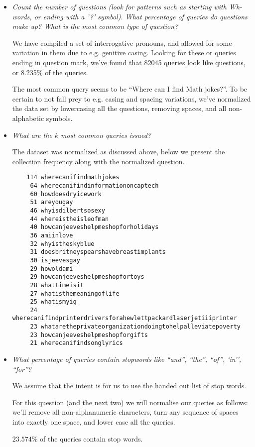 \begin{itemize}
\item \emph{Count the number of questions (look for patterns such as starting
with Wh-words, or ending with a '?'    symbol). What percentage of queries do
questions make up? What is the most common type of question?}

We have compiled a set of interrogative pronouns, and allowed for some variation
in them due to e.g. genitive casing. Looking for these or queries ending in
question mark, we've found that 82045 queries look like questions, or 8.235\%
of the queries.

The most common query seems to be ``Where can I find Math jokes?''. To be
certain to not fall prey to e.g. casing and spacing variations, we've
normalized the data set by lowercasing all the questions, removing spaces, and
all non-alphabetic symbols.

\item \emph{What are the $k$ most common queries issued?}

The dataset was normalized as discussed above, below we present the collection
frequency along with the normalized question.

\begin{lstlisting}
    114 wherecanifindmathjokes
     64 wherecanifindinformationoncaptech
     60 howdoesdryicework
     51 areyougay
     46 whyisdilbertsosexy
     44 whereistheisleofman
     40 howcanjeeveshelpmeshopforholidays
     36 amiinlove
     32 whyistheskyblue
     31 doesbritneyspearshavebreastimplants
     30 isjeevesgay
     29 howoldami
     29 howcanjeeveshelpmeshopfortoys
     28 whattimeisit
     27 whatisthemeaningoflife
     25 whatismyiq
     24 wherecanifindprinterdriversforahewlettpackardlaserjetiiiprinter
     23 whataretheprivateorganizationdoingtohelpalleviatepoverty
     23 howcanjeeveshelpmeshopforgifts
     21 wherecanifindsonglyrics
\end{lstlisting}

\item \emph{What percentage of queries contain stopwords like ``and'', ``the'',
``of'', `in'', ``for''?}

We assume that the intent is for us to use the handed out list of stop words.

For this question (and the next two) we will normalise our queries as follows:
we'll remove all non-alphanumeric characters, turn any sequence of spaces into
exactly one space, and lower case all the queries.

$23.574\%$ of the queries contain stop words.


\end{itemize}
